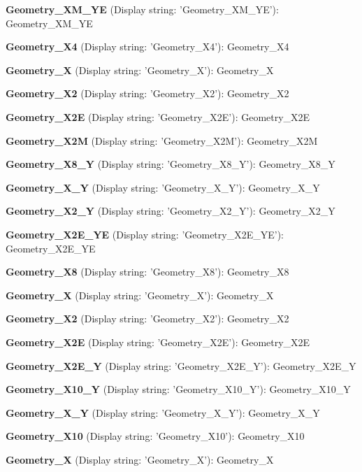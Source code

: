 \begin{DoxyItemize}
\item {\bfseries Geometry\+\_\+X\+M\+\_\+Y\+E} (Display string\+: 'Geometry\+\_\+X\+M\+\_\+Y\+E')\+: Geometry\+\_\+X\+M\+\_\+Y\+E
\item {\bfseries Geometry\+\_\+X4} (Display string\+: 'Geometry\+\_\+X4')\+: Geometry\+\_\+X4
\item {\bfseries Geometry\+\_\+X} (Display string\+: 'Geometry\+\_\+X')\+: Geometry\+\_\+X
\item {\bfseries Geometry\+\_\+X2} (Display string\+: 'Geometry\+\_\+X2')\+: Geometry\+\_\+X2
\item {\bfseries Geometry\+\_\+X2\+E} (Display string\+: 'Geometry\+\_\+X2\+E')\+: Geometry\+\_\+X2\+E
\item {\bfseries Geometry\+\_\+X2\+M} (Display string\+: 'Geometry\+\_\+X2\+M')\+: Geometry\+\_\+X2\+M
\item {\bfseries Geometry\+\_\+X8\+\_\+Y} (Display string\+: 'Geometry\+\_\+X8\+\_\+Y')\+: Geometry\+\_\+X8\+\_\+Y
\item {\bfseries Geometry\+\_\+X\+\_\+Y} (Display string\+: 'Geometry\+\_\+X\+\_\+Y')\+: Geometry\+\_\+X\+\_\+Y
\item {\bfseries Geometry\+\_\+X2\+\_\+Y} (Display string\+: 'Geometry\+\_\+X2\+\_\+Y')\+: Geometry\+\_\+X2\+\_\+Y
\item {\bfseries Geometry\+\_\+X2\+E\+\_\+Y\+E} (Display string\+: 'Geometry\+\_\+X2\+E\+\_\+Y\+E')\+: Geometry\+\_\+X2\+E\+\_\+Y\+E
\item {\bfseries Geometry\+\_\+X8} (Display string\+: 'Geometry\+\_\+X8')\+: Geometry\+\_\+X8
\item {\bfseries Geometry\+\_\+X} (Display string\+: 'Geometry\+\_\+X')\+: Geometry\+\_\+X
\item {\bfseries Geometry\+\_\+X2} (Display string\+: 'Geometry\+\_\+X2')\+: Geometry\+\_\+X2
\item {\bfseries Geometry\+\_\+X2\+E} (Display string\+: 'Geometry\+\_\+X2\+E')\+: Geometry\+\_\+X2\+E
\item {\bfseries Geometry\+\_\+X2\+E\+\_\+Y} (Display string\+: 'Geometry\+\_\+X2\+E\+\_\+Y')\+: Geometry\+\_\+X2\+E\+\_\+Y
\item {\bfseries Geometry\+\_\+X10\+\_\+Y} (Display string\+: 'Geometry\+\_\+X10\+\_\+Y')\+: Geometry\+\_\+X10\+\_\+Y
\item {\bfseries Geometry\+\_\+X\+\_\+Y} (Display string\+: 'Geometry\+\_\+X\+\_\+Y')\+: Geometry\+\_\+X\+\_\+Y
\item {\bfseries Geometry\+\_\+X10} (Display string\+: 'Geometry\+\_\+X10')\+: Geometry\+\_\+X10
\item {\bfseries Geometry\+\_\+X} (Display string\+: 'Geometry\+\_\+X')\+: Geometry\+\_\+X
\end{DoxyItemize}

